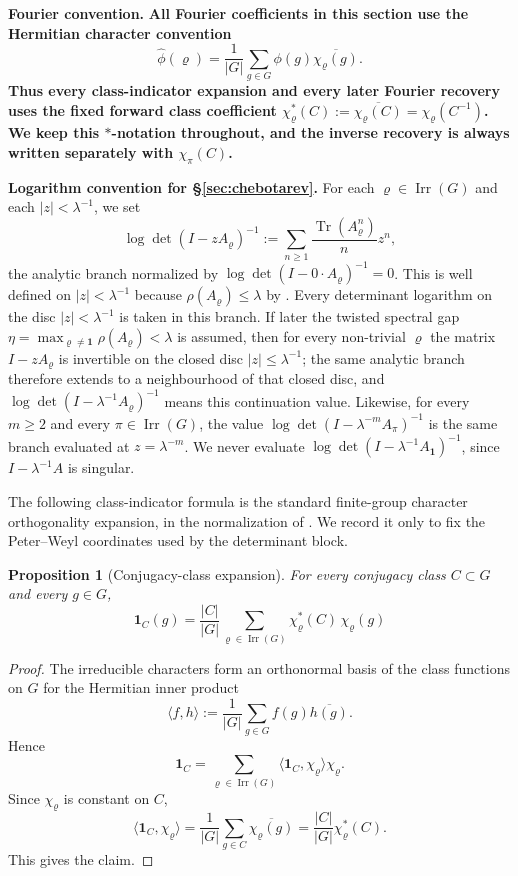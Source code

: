 \documentclass[11pt,a4paper]{amsart}
\theoremstyle{plain}
\newtheorem{proposition}[theorem]{Proposition}
\theoremstyle{definition}
\theoremstyle{remark}
\DeclareMathOperator{\Tr}{Tr}
\DeclareMathOperator{\Irr}{Irr}
\begin{document}
\medskip
\noindent\textbf{Fourier convention.}
\textbf{All Fourier coefficients in this section use the Hermitian
character convention}
\[
  \widehat\phi(\varrho)
  =\frac{1}{|G|}\sum_{g\in G}\phi(g)\overline{\chi_\varrho(g)}.
\]
\textbf{Thus every class-indicator expansion and every later Fourier
recovery uses the fixed forward class coefficient
\(\chi_\varrho^\ast(C):=\overline{\chi_\varrho(C)}
=\chi_\varrho(C^{-1})\).
We keep this \(\ast\)-notation throughout, and the inverse recovery is
always written separately with \(\chi_\pi(C)\).}

\medskip
\noindent\textbf{Logarithm convention for \S\ref{sec:chebotarev}.}
For each \(\varrho\in\Irr(G)\) and each \(|z|<\lambda^{-1}\), we set
\[
  \log\det(I-zA_\varrho)^{-1}
  :=
  \sum_{n\ge 1}\frac{\Tr(A_\varrho^n)}{n}z^n,
\]
the analytic branch normalized by
\(\log\det(I-0\cdot A_\varrho)^{-1}=0\). This is well defined on
\(|z|<\lambda^{-1}\) because \(\rho(A_\varrho)\le \lambda\) by
. Every determinant logarithm
on the disc \(|z|<\lambda^{-1}\) is taken in this branch. If later the
twisted spectral gap
\(\eta=\max_{\varrho\neq\mathbf 1}\rho(A_\varrho)<\lambda\) is assumed,
then for every non-trivial \(\varrho\) the matrix \(I-zA_\varrho\) is
invertible on the closed disc \(|z|\le \lambda^{-1}\); the same analytic
branch therefore extends to a neighbourhood of that closed disc, and
\(\log\det(I-\lambda^{-1}A_\varrho)^{-1}\) means this continuation value.
Likewise, for every \(m\ge 2\) and every \(\pi\in\Irr(G)\), the value
\(\log\det(I-\lambda^{-m}A_\pi)^{-1}\) is the same branch evaluated at
\(z=\lambda^{-m}\). We never evaluate
\(\log\det(I-\lambda^{-1}A_{\mathbf 1})^{-1}\), since
\(I-\lambda^{-1}A\) is singular.

The following class-indicator formula is the standard finite-group character
orthogonality expansion, in the normalization of
\cite{Serre1977LinearRepresentations}.  We record it only to fix the
Peter--Weyl coordinates used by the determinant block.

\begin{proposition}[Conjugacy-class expansion]
  \label{prop:class-indicator-expansion}
  For every conjugacy class \(C\subset G\) and every \(g\in G\),
  \[
    \mathbf 1_C(g)
    =\frac{|C|}{|G|}
      \sum_{\varrho\in\Irr(G)}
        \chi_\varrho^\ast(C)\,\chi_\varrho(g)
  \]
\end{proposition}

\begin{proof}
  The irreducible characters form an orthonormal basis of the class
  functions on \(G\) for the Hermitian inner product
  \[
    \langle f,h\rangle
    :=\frac{1}{|G|}\sum_{g\in G}f(g)\overline{h(g)}.
  \]
  Hence
  \[
    \mathbf 1_C
    =\sum_{\varrho\in\Irr(G)}
      \langle \mathbf 1_C,\chi_\varrho\rangle \chi_\varrho.
  \]
  Since \(\chi_\varrho\) is constant on \(C\),
  \[
    \langle \mathbf 1_C,\chi_\varrho\rangle
    =\frac{1}{|G|}\sum_{g\in C}\overline{\chi_\varrho(g)}
    =\frac{|C|}{|G|}\chi_\varrho^\ast(C).
  \]
  This gives the claim.
\end{proof}
\end{document}
